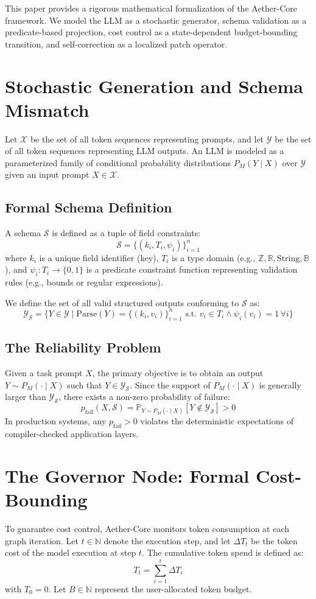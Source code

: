 \documentclass[10pt,journal,compsoc]{IEEEtran}
\begin{document}
This paper provides a rigorous mathematical formalization of the Aether-Core framework. We model the LLM as a stochastic generator, schema validation as a predicate-based projection, cost control as a state-dependent budget-bounding transition, and self-correction as a localized patch operator.

\section{Stochastic Generation and Schema Mismatch}
Let $\mathcal{X}$ be the set of all token sequences representing prompts, and let $\mathcal{Y}$ be the set of all token sequences representing LLM outputs. 
An LLM is modeled as a parameterized family of conditional probability distributions $P_M(Y \mid X)$ over $\mathcal{Y}$ given an input prompt $X \in \mathcal{X}$.

\subsection{Formal Schema Definition}
A schema $\mathcal{S}$ is defined as a tuple of field constraints:
\[ \mathcal{S} = \{ (k_i, T_i, \psi_i) \}_{i=1}^n \]
where $k_i$ is a unique field identifier (key), $T_i$ is a type domain (e.g., $\mathbb{Z}, \mathbb{R}, \text{String}, \mathbb{B}$), and $\psi_i: T_i \to \{0, 1\}$ is a predicate constraint function representing validation rules (e.g., bounds or regular expressions).

We define the set of all valid structured outputs conforming to $\mathcal{S}$ as:
\[ \mathcal{Y}_{\mathcal{S}} = \{ Y \in \mathcal{Y} \mid \text{Parse}(Y) = \{ (k_i, v_i) \}_{i=1}^n \text{ s.t. } v_i \in T_i \land \psi_i(v_i) = 1 \, \forall i \} \]

\subsection{The Reliability Problem}
Given a task prompt $X$, the primary objective is to obtain an output $Y \sim P_M(\cdot \mid X)$ such that $Y \in \mathcal{Y}_{\mathcal{S}}$. Since the support of $P_M(\cdot \mid X)$ is generally larger than $\mathcal{Y}_{\mathcal{S}}$, there exists a non-zero probability of failure:
\[ p_{\text{fail}}(X, \mathcal{S}) = \mathbb{P}_{Y \sim P_M(\cdot \mid X)} [Y \notin \mathcal{Y}_{\mathcal{S}}] > 0 \]
In production systems, any $p_{\text{fail}} > 0$ violates the deterministic expectations of compiler-checked application layers.

\section{The Governor Node: Formal Cost-Bounding}
To guarantee cost control, Aether-Core monitors token consumption at each graph iteration. Let $t \in \mathbb{N}$ denote the execution step, and let $\Delta T_t$ be the token cost of the model execution at step $t$. The cumulative token spend is defined as:
\[ T_t = \sum_{i=1}^t \Delta T_i \]
with $T_0 = 0$. Let $B \in \mathbb{N}$ represent the user-allocated token budget.
\end{document}
